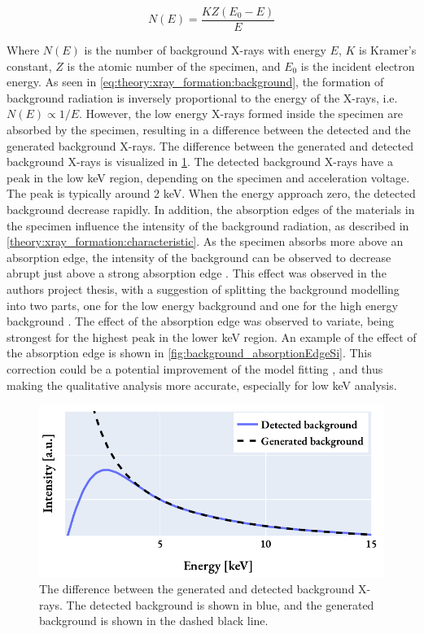 \begin{equation}
    \label{eq:theory:xray_formation:background}
    N(E) = \frac{K Z (E_0-E)}{E}
\end{equation}

Where $N(E)$ is the number of background X-rays with energy $E$, $K$ is Kramer's constant, $Z$ is the atomic number of the specimen, and $E_0$ is the incident electron energy.
As seen in \cref{eq:theory:xray_formation:background}, the formation of background radiation is inversely proportional to the energy of the X-rays, i.e. $N(E) \propto 1/E$.
However, the low energy X-rays formed inside the specimen are absorbed by the specimen, resulting in a difference between the detected and the generated background X-rays.
The difference between the generated and detected background X-rays is visualized in \cref{fig:background_xrays}.
The detected background X-rays have a peak in the low keV region, depending on the specimen and acceleration voltage.
The peak is typically around 2 keV.
When the energy approach zero, the detected background decrease rapidly.
In addition, the absorption edges of the materials in the specimen influence the intensity of the background radiation, as described in \cref{theory:xray_formation:characteristic}.
As the specimen absorbs more above an absorption edge, the intensity of the background can be observed to decrease abrupt just above a strong absorption edge \cite[p. 59]{goldstein_scanning_2018}.
This effect was observed in the authors project thesis, with a suggestion of splitting the background modelling into two parts, one for the low energy background and one for the high energy background \cite{project_report}.
The effect of the absorption edge was observed to variate, being strongest for the highest peak in the lower keV region.
An example of the effect of the absorption edge is shown in \cref{fig:background_absorptionEdgeSi}.
This correction could be a potential improvement of the model fitting \cite{hyperspy_1.7.1,nilsen_factorless_2021}, and thus making the qualitative analysis more accurate, especially for low keV analysis.


\begin{figure}[pht]
    \centering
    \includegraphics[width=0.8\linewidth]{figures/background_generated_detected.pdf}
    \caption{
        The difference between the generated and detected background X-rays.
        The detected background is shown in blue, and the generated background is shown in the dashed black line.
    }
    \label{fig:background_xrays}
\end{figure}

